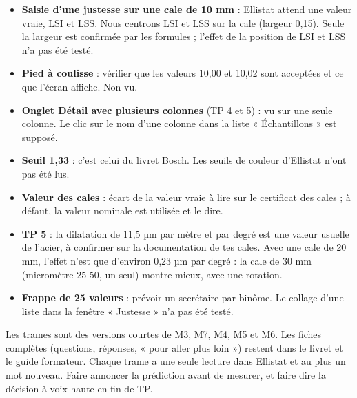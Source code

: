 \documentclass[10pt,a4paper]{article}
\begin{document}
\begin{itemize}
\item \textbf{Saisie d'une justesse sur une cale de 10 mm} : Ellistat attend une valeur vraie, LSI et LSS. Nous centrons LSI et LSS sur la cale (largeur 0,15). Seule la largeur est confirmée par les formules ; l'effet de la position de LSI et LSS n'a pas été testé.
\item \textbf{Pied à coulisse} : vérifier que les valeurs 10,00 et 10,02 sont acceptées et ce que l'écran affiche. Non vu.
\item \textbf{Onglet Détail avec plusieurs colonnes} (TP 4 et 5) : vu sur une seule colonne. Le clic sur le nom d'une colonne dans la liste « Échantillons » est supposé.
\item \textbf{Seuil 1,33} : c'est celui du livret Bosch. Les seuils de couleur d'Ellistat n'ont pas été lus.
\item \textbf{Valeur des cales} : écart de la valeur vraie à lire sur le certificat des cales ; à défaut, la valeur nominale est utilisée et le dire.
\item \textbf{TP 5} : la dilatation de 11,5 µm par mètre et par degré est une valeur usuelle de l'acier, à confirmer sur la documentation de tes cales. Avec une cale de 20 mm, l'effet n'est que d'environ 0,23 µm par degré : la cale de 30 mm (micromètre 25-50, un seul) montre mieux, avec une rotation.
\item \textbf{Frappe de 25 valeurs} : prévoir un secrétaire par binôme. Le collage d'une liste dans la fenêtre « Justesse » n'a pas été testé.
\end{itemize}
Les trames sont des versions courtes de M3, M7, M4, M5 et M6. Les fiches complètes (questions, réponses, « pour aller plus loin ») restent dans le livret et le guide formateur. Chaque trame a une seule lecture dans Ellistat et au plus un mot nouveau. Faire annoncer la prédiction avant de mesurer, et faire dire la décision à voix haute en fin de TP.
\end{document}
